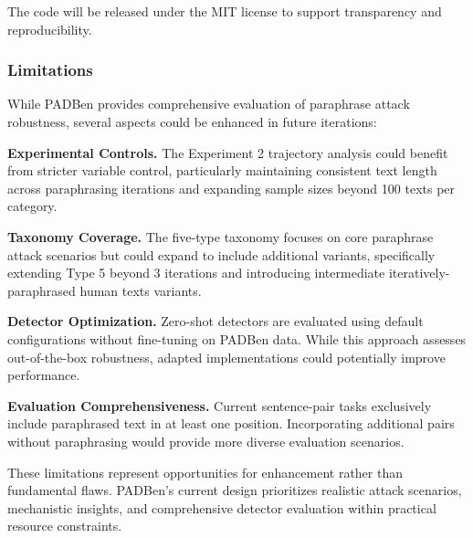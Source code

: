 The code will be released under the MIT license to support transparency and reproducibility.

\subsubsection{Limitations}

While PADBen provides comprehensive evaluation of paraphrase attack robustness, several aspects could be enhanced in future iterations:

\textbf{Experimental Controls.} The Experiment 2 trajectory analysis could benefit from stricter variable control, particularly maintaining consistent text length across paraphrasing iterations and expanding sample sizes beyond 100 texts per category.

\textbf{Taxonomy Coverage.} The five-type taxonomy focuses on core paraphrase attack scenarios but could expand to include additional variants, specifically extending Type 5 beyond 3 iterations and introducing intermediate iteratively-paraphrased human texts variants.

\textbf{Detector Optimization.} Zero-shot detectors are evaluated using default configurations without fine-tuning on PADBen data. While this approach assesses out-of-the-box robustness, adapted implementations could potentially improve performance.

\textbf{Evaluation Comprehensiveness.} Current sentence-pair tasks exclusively include paraphrased text in at least one position. Incorporating additional pairs without paraphrasing would provide more diverse evaluation scenarios.

These limitations represent opportunities for enhancement rather than fundamental flaws. PADBen's current design prioritizes realistic attack scenarios, mechanistic insights, and comprehensive detector evaluation within practical resource constraints.
